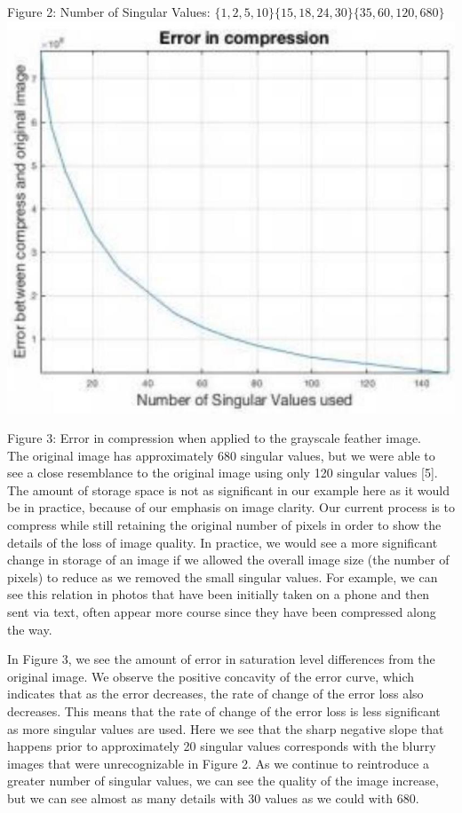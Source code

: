\documentclass[10pt]{article}
\begin{document}
Figure 2: Number of Singular Values: $\{1,2,5,10\}\{15,18,24,30\}\{35,60,120,680\}$\\
\includegraphics[max width=\textwidth, center]{2025_04_09_7d70d965b908bc4c1892g-4(1)}

Figure 3: Error in compression when applied to the grayscale feather image.\\[0pt]
The original image has approximately 680 singular values, but we were able to see a close resemblance to the original image using only 120 singular values [5]. The amount of storage space is not as significant in our example here as it would be in practice, because of our emphasis on image clarity. Our current process is to compress while still retaining the original number of pixels in order to show the details of the loss of image quality. In practice, we would see a more significant change in storage of an image if we allowed the overall image size (the number of pixels) to reduce as we removed the small singular values. For example, we can see this relation in photos that have been initially taken on a phone and then sent via text, often appear more course since they have been compressed along the way.

In Figure 3, we see the amount of error in saturation level differences from the original image. We observe the positive concavity of the error curve, which indicates that as the error decreases, the rate of change of the error loss also\\
decreases. This means that the rate of change of the error loss is less significant as more singular values are used. Here we see that the sharp negative slope that happens prior to approximately 20 singular values corresponds with the blurry images that were unrecognizable in Figure 2. As we continue to reintroduce a greater number of singular values, we can see the quality of the image increase, but we can see almost as many details with 30 values as we could with 680.
\end{document}
